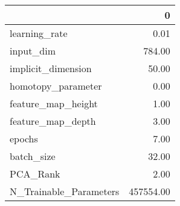 \begin{tabular}{lr}
\toprule
{} &          0 \\
\midrule
learning\_rate          &       0.01 \\
input\_dim              &     784.00 \\
implicit\_dimension     &      50.00 \\
homotopy\_parameter     &       0.00 \\
feature\_map\_height     &       1.00 \\
feature\_map\_depth      &       3.00 \\
epochs                 &       7.00 \\
batch\_size             &      32.00 \\
PCA\_Rank               &       2.00 \\
N\_Trainable\_Parameters &  457554.00 \\
\bottomrule
\end{tabular}
